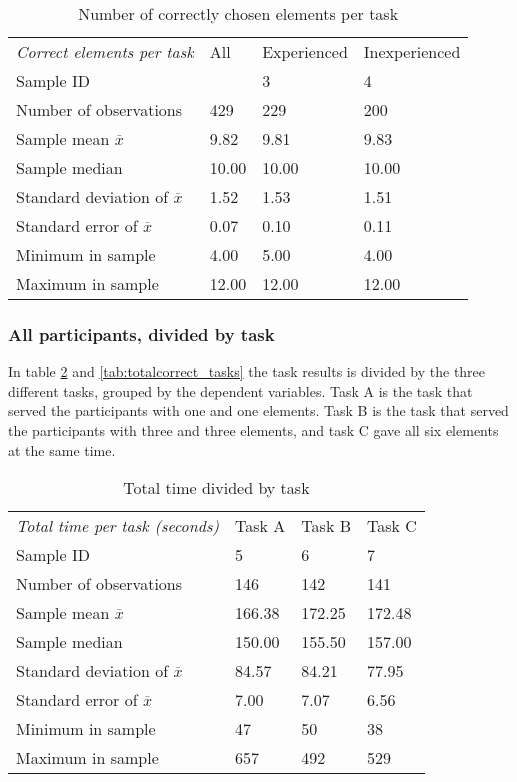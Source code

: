 \begin{table}[H]
	\centering
	\begin{tabular}{l|l|l|l}
		\textit{Correct elements per task } & All  & Experienced & Inexperienced \\ 
		Sample ID &   & 3  & 4   \\ \hline
		Number of observations & 429    & 229  & 200   \\
		Sample mean $\overline{x}$   & 9.82 & 9.81  & 9.83  \\
		Sample median & 10.00 & 10.00 & 10.00 \\
		Standard deviation of $\overline{x}$   & 1.52  & 1.53  &  1.51 \\
		Standard error of $\overline{x}$   & 0.07  & 0.10 &  0.11 \\
		Minimum in sample & 4.00 & 5.00  &  4.00  \\
		Maximum in sample  & 12.00 & 12.00  & 12.00  \\ \hline
	\end{tabular}
	\caption[Correct elements, all participants]{Number of correctly chosen elements per task}
	\label{tab:totalcorrect_all}
\end{table}

\subsubsection{All participants, divided by task}\label{sec:taskdivided_all}

In table \ref{tab:totaltime_tasks} and \ref{tab:totalcorrect_tasks} the task results is divided by the three different tasks, grouped by the dependent variables. Task A is the task that served the participants with one and one elements. Task B is the task that served the participants with three and three elements, and task C gave all six elements at the same time. 

\begin{table}[H]
	\centering
	\begin{tabular}{l|l|l|l}
		\textit{Total time per task (seconds)} & Task A & Task B & Task C \\ 		
		Sample ID & 5  & 6  & 7    \\ \hline
		Number of observations & 146    & 142      & 141     \\
		Sample mean $\overline{x}$  & 166.38  &  172.25   &   172.48  \\
		Sample median & 150.00  &  155.50  & 157.00  \\
		Standard deviation of $\overline{x}$   & 84.57  & 84.21  & 77.95   \\
		Standard error of $\overline{x}$   & 7.00 & 7.07 & 6.56 \\
		Minimum in sample    & 47  & 50 &   38   \\
		Maximum in sample   & 657 & 492  & 529 \\ \hline
	\end{tabular}
	\caption[Total time, divided by task]{Total time divided by task}
	\label{tab:totaltime_tasks}
\end{table}

